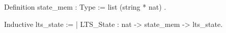 Definition state_mem : Type := list (string * nat) .

Inductive lts_state :=
  | LTS_State : nat -> state_mem -> lts_state.